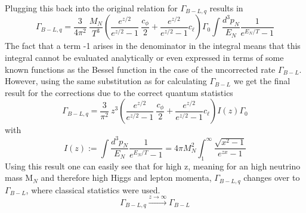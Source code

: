 Plugging this back into the original relation for $\Gamma_{B-L,q}$ results in
\begin{equation*}
\Gamma_{B-L,q}=\frac{3}{4\pi^2}\:\frac{M_N}{T^3}\left(\frac{e^{z/2}}{e^{z/2}-1}\:\frac{c_\phi}{2}+\frac{e^{z/2}}{e^{z/2}-1}c_\ell\right)\Gamma_0\int \frac{d^3p_N}{E_N}\frac{1}{e^{E_N/T}-1}
\end{equation*}
The fact that a term -1 arises in the denominator in the integral means that this integral cannot be evaluated analytically or even expressed in terms of some known functions as the Bessel function in the case of the uncorrected rate $\Gamma_{B-L}$. However, using the same substitution as for calculating $\Gamma_{B-L}$ we get the final result for the corrections due to the correct quantum statistics
\begin{equation*}
	\Gamma_{B-L,q}=\frac{3}{\pi^2}\:z^3\left(\frac{e^{z/2}}{e^{z/2}-1}\:\frac{c_\phi}{2}+\frac{e^{z/2}}{e^{z/2}-1}c_\ell\right)I(z)\Gamma_0
\end{equation*}
with 
\begin{equation*}
	I(z):=\int \frac{d^3p_N}{E_N}\frac{1}{e^{E_N/T}-1}=4\pi M_N^2\int_{1}^{\infty}\frac{\sqrt{x^2-1}}{e^{zx}-1}
\end{equation*}
Using this result one can easily see that for high z, meaning for an high neutrino mass M$_N$ and therefore high Higgs and lepton momenta, $\Gamma_{B-L,q}$ changes over to $\Gamma_{B-L}$, where classical statistics were used.
\begin{equation*}
	\Gamma_{B-L,q}\overset{z\rightarrow\infty}{\longrightarrow}\Gamma_{B-L}
\end{equation*}